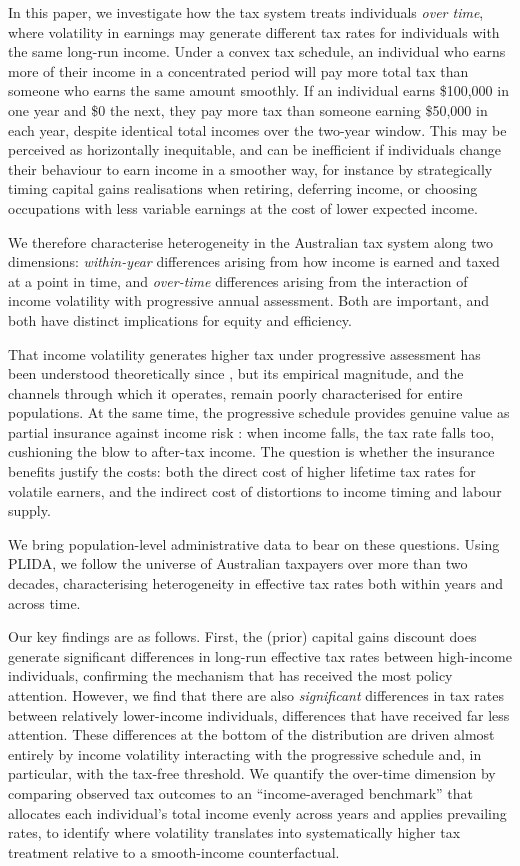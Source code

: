 \documentclass[12pt,a4paper]{article}
\begin{document}
In this paper, we investigate how the tax system treats individuals \emph{over time}, where volatility in earnings may generate different tax rates for individuals with the same long-run income. Under a convex tax schedule, an individual who earns more of their income in a concentrated period will pay more total tax than someone who earns the same amount smoothly. If an individual earns \$100,000 in one year and \$0 the next, they pay more tax than someone earning \$50,000 in each year, despite identical total incomes over the two-year window. This may be perceived as horizontally inequitable, and can be inefficient if individuals change their behaviour to earn income in a smoother way, for instance by strategically timing capital gains realisations when retiring, deferring income, or choosing occupations with less variable earnings at the cost of lower expected income.

We therefore characterise heterogeneity in the Australian tax system along two dimensions: \emph{within-year} differences arising from how income is earned and taxed at a point in time, and \emph{over-time} differences arising from the interaction of income volatility with progressive annual assessment. Both are important, and both have distinct implications for equity and efficiency.

That income volatility generates higher tax under progressive assessment has been understood theoretically since \citet{Vickrey1939}, but its empirical magnitude, and the channels through which it operates, remain poorly characterised for entire populations. At the same time, the progressive schedule provides genuine value as partial insurance against income risk \citep{HeathcoteStorViol2017,Choetal2024}: when income falls, the tax rate falls too, cushioning the blow to after-tax income. The question is whether the insurance benefits justify the costs: both the direct cost of higher lifetime tax rates for volatile earners, and the indirect cost of distortions to income timing and labour supply.

We bring population-level administrative data to bear on these questions. Using PLIDA, we follow the universe of Australian taxpayers over more than two decades, characterising heterogeneity in effective tax rates both within years and across time.

Our key findings are as follows. First, the (prior) capital gains discount does generate significant differences in long-run effective tax rates between high-income individuals, confirming the mechanism that has received the most policy attention. However, we find that there are also \emph{significant} differences in tax rates between relatively lower-income individuals, differences that have received far less attention. These differences at the bottom of the distribution are driven almost entirely by income volatility interacting with the progressive schedule and, in particular, with the tax-free threshold. We quantify the over-time dimension by comparing observed tax outcomes to an ``income-averaged benchmark'' that allocates each individual's total income evenly across years and applies prevailing rates, to identify where volatility translates into systematically higher tax treatment relative to a smooth-income counterfactual.
\end{document}
